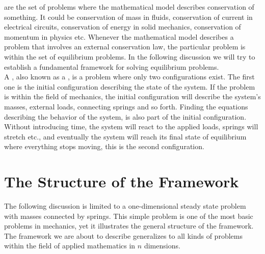 
\label{sec:framework_for_equilibrium_problems}
 are the set of problems
where the mathematical model describes conservation of something. It could be
conservation of mass in fluids, conservation of current in electrical
circuits, conservation of energy in solid mechanics, conservation of
momentum in physics etc. Whenever the mathematical model describes a problem
that involves an external conservation law, %
the particular problem is within the set of
equilibrium problems. In the following discussion we will try to
establish a fundamental framework for solving equilibrium problems.\\

 
A , also known as a , is a problem where only
two configurations exist.  
The first one is the initial configuration describing the state of the
system. If the problem is within the field of mechanics, the initial
configuration will describe the system's masses, external loads, connecting springs and
so forth. Finding the equations describing the behavior of the
system, is also part of the initial configuration.
Without introducing time, the system will react to the applied loads,
springs will stretch etc., and eventually the system will reach its final
state of equilibrium where everything stops moving, this is the second configuration. \\


\section{The Structure of the Framework}
The following discussion is limited to a one-dimensional steady state
problem with masses connected by springs. This simple problem is one of the most
basic problems in mechanics, yet it illustrates the general
structure of the framework. The framework we are about to describe
generalizes to all kinds of problems within the field of applied mathematics in
$n$ dimensions. \\ 

